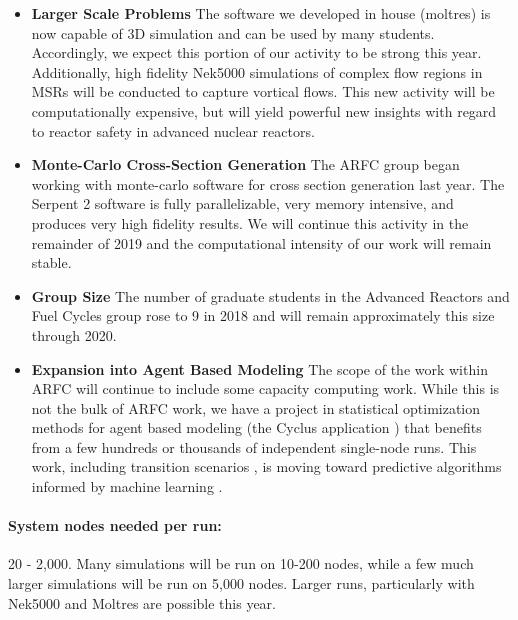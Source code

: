 \documentclass[letterpaper]{article}
\begin{document}
\begin{itemize}
        \item \textbf{Larger Scale Problems} The software we developed in house 
                (moltres) is now capable of 3D simulation and can be used by 
                many students. Accordingly, we expect this portion of our 
                activity to be strong this year. Additionally, high fidelity 
                Nek5000 \cite{fischer_petascale_2008} simulations of complex flow regions in MSRs will be 
                conducted to capture vortical flows. This new activity will be 
                computationally expensive, but will yield powerful new insights 
                with regard to reactor safety in advanced nuclear reactors.
        \item \textbf{Monte-Carlo Cross-Section Generation} The ARFC group 
                began working with monte-carlo software for cross section 
                generation last year. The Serpent 2 software is fully parallelizable, very 
                memory intensive, and produces very high fidelity results. 
                We will continue this activity in the remainder of 2019 and the computational 
                intensity of our work will remain stable.
\item \textbf{Group Size} The number of graduate students in the Advanced Reactors and Fuel Cycles
                group rose to 9 in 2018 and will remain approximately this size 
                through 2020.
        \item \textbf{Expansion into Agent Based Modeling} The scope of the 
                work within ARFC will continue to include some capacity 
                computing work. While this is not the bulk of ARFC work, we 
                have a project in statistical optimization methods for agent 
                based modeling (the Cyclus application 
                \cite{huff_fundamental_2016}) that benefits
                from a few hundreds or thousands of independent single-node 
                runs. This work, including transition scenarios 
                \cite{bae_synergistic_2019,bae_standardized_2019}, is moving toward predictive algorithms informed 
                by machine learning \cite{bae_deep_2019}.
\end{itemize}

\paragraph{System nodes needed per run:} 20 - 2,000. Many simulations will be 
run on 10-200 nodes, while a few much larger simulations will be run on 5,000 
nodes. Larger runs, particularly with Nek5000 and Moltres are possible this year.
\end{document}
